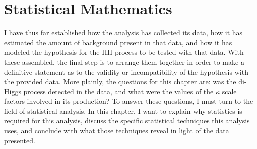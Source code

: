 %


\section{Statistical Mathematics}

    I have thus far established how the analysis has collected its data,
        how it has estimated the amount of background present in that data,
        and how it has modeled the hypothesis for the HH process to be tested with that data.
    With these assembled, the final step is to arrange them together in order to make a definitive statement
        as to the validity or incompatibility of the hypothesis with the provided data.
    More plainly, the questions for this chapter are:
        was the di-Higgs process detected in the data,
        and what were the values of the $\kappa$ scale factors involved in its production?
    To answer these questions, I must turn to the field of statistical analysis.
    In this chapter, I want to explain why statistics is required for this analysis,
        discuss the specific statistical techniques this analysis uses,
        and conclude with what those techniques reveal in light of the data presented.

